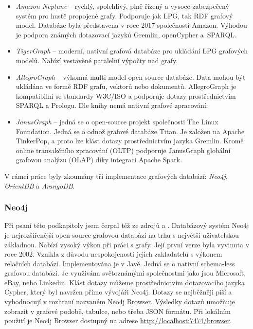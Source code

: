 \documentclass[
  program=infoi,
  biblatex=true,
  figures=true,
  glossaries=false,
  index,
  sourcecodes=true
]{kidiplom}
\begin{document}
\begin{itemize}
\item \textit{Amazon Neptune} -- rychlý, spolehlivý, plně řízený a vysoce zabezpečený systém pro hustě propojené grafy. Podporuje jak LPG, tak RDF grafový model. Databáze byla představena v roce 2017 společností Amazon. Výhodou je podpora známých dotazovací jazyků Gremlin, openCypher a~SPARQL.\cite{amazonNeptune}
\item \textit{TigerGraph} -- moderní, nativní grafová databáze pro ukládání LPG grafových modelů. Nabízí vestavěné paralelní výpočty nad grafy.\cite{tigerGraph}
\item \textit{AllegroGraph} -- výkonná multi-model open-source databáze. Data mohou být ukládána ve formě RDF grafu, vektorů nebo dokumentů. AllegroGraph je kompatibilní se standardy W3C/ISO a podporuje dotazy prostřednictvím SPARQL a Prologu.\cite{allegroGraph} Dle knihy \cite{graphDatabases} nemá nativní grafové zpracování.
\item \textit{JanusGraph} -- jedná se o open-source projekt společnosti The Linux Foundation. Jedná se o odnož grafové databáze Titan. Je založen na Apache TinkerPop, a proto lze klást dotazy prostřednictvím jazyka Gremlin. Kromě online transakčního zpracování (OLTP) podporuje JanusGraph globální grafovou analýzu (OLAP) díky integraci Apache Spark.\cite{janusGraph}
\end{itemize}
V rámci práce byly zkoumány tři implementace grafových databází: \textit{Neo4j}, \textit{OrientDB} a \textit{ArangoDB}.

\subsubsection{Neo4j}
Při psaní této podkapitoly jsem čerpal též ze zdrojů \cite{neo4jDoc} a \cite{neo4jDev}. Databázový systém Neo4j je nejrozšířenější open-source grafovou databází na trhu s největší uživatelskou základnou. Nabízí vysoký výkon při práci s grafy. Její první verze byla vyvinuta v roce 2002. Vznikla z důvodu nespokojenosti jejich zakladatelů s výkonem relačních databází. Implementována je v Javě. Jedná se o nativní schema-less grafovou databázi. Je využívána světoznámými společnostmi jako jsou Microsoft, eBay, nebo Linkedin. Klást dotazy můžeme prostřednictvím dotazovacího jazyka Cypher, který byl navržen přímo vývojáři Neo4j. Dotazy se nejběžněji píší a vyhodnocují v rozhraní nazvaném Neo4j Browser. Výsledky dotazů umožňuje zobrazit v grafové podobě, tabulce, nebo třeba JSON formátu. Při lokálním použití je Neo4j Browser dostupný na adrese \url{http://localhost:7474/browser}.
\end{document}
